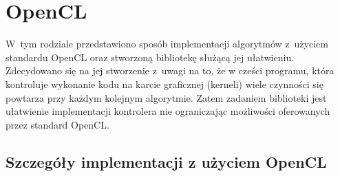 \chapter{OpenCL}
\label{cha:opencl}

W~tym rodziale przedstawiono sposób implementacji algorytmów z~użyciem standardu OpenCL oraz stworzoną bibliotekę służącą jej ułatwieniu. Zdecydowano się na jej stworzenie z~uwagi na to, że w cześci programu, która kontroluje wykonanie kodu na karcie graficznej (kerneli) wiele czynności się powtarza przy każdym kolejnym algorytmie. Zatem zadaniem biblioteki jest ułatwienie implementacji kontrolera nie ograniczając możliwości oferowanych przez standard OpenCL.

\section{Szczegóły implementacji z użyciem OpenCL}  
\label{sec:szczegolyOpenCL}

